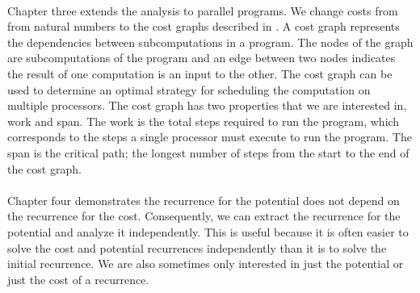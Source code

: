 \paragraph{}
Chapter three extends the analysis to parallel programs. We change costs from
from natural numbers to the cost graphs described in \citet{Harper2012PFPL}. A cost
graph represents the dependencies between subcomputations in a program. The
nodes of the graph are subcomputations of the program and an edge between two
nodes indicates the result of one computation is an input to the other. The
cost graph can be used to determine an optimal strategy for scheduling the
computation on multiple processors. The cost graph has two properties that we
are interested in, work and span. The work is the total steps required to run
the program, which corresponds to the steps a single processor must execute to
run the program. The span is the critical path; the longest number of steps
from the start to the end of the cost graph.

\paragraph{}
Chapter four demonstrates the recurrence for the potential does not depend on
the recurrence for the cost. Consequently, we can extract the recurrence for the
potential and analyze it independently. This is useful because it is often
easier to solve the cost and potential recurrences independently than it is to
solve the initial recurrence. We are also sometimes only interested in just the
potential or just the cost of a recurrence.
